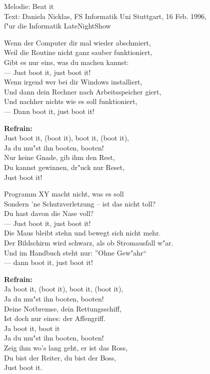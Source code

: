 

\begin{songinfo}
Melodie: Beat it\\
Text: Daniela Nicklas, FS Informatik Uni Stuttgart, 16 Feb. 1996,\\
f"ur die Informatik LateNightShow
\end{songinfo}

\begin{song}

Wenn der Computer dir mal wieder abschmiert,\\
Weil die Routine nicht ganz sauber funktioniert,\\
Gibt es nur eins, was du machen kannst:\\
--- Just boot it, just boot it!\\
Wenn irgend wer bei dir Windows installiert,\\
Und dann dein Rechner nach Arbeitsspeicher giert,\\
Und nachher nichts wie es soll funktioniert,\\
--- Dann boot it, just boot it!

\textbf{Refrain:}\\
Just boot it, (boot it), boot it, (boot it),\\
Ja du mu"st ihn booten, booten!\\
Nur keine Gnade, gib ihm den Rest,\\
Du kannst gewinnen, dr"uck nur Reset,\\
Just boot it!

Programm XY macht nicht, was es soll\\
Sondern 'ne Schutzverletzung -- ist das nicht toll?\\
Du hast davon die Nase voll?\\
--- Just boot it, just boot it!\\
Die Maus bleibt stehn und bewegt sich nicht mehr.\\
Der Bildschirm wird schwarz, als ob Stromausfall w"ar.\\
Und im Handbuch steht nur: ''Ohne Gew"ahr{``}\\
--- dann boot it, just boot it!

\textbf{Refrain:}\\
Ja boot it, (boot it), boot it, (boot it),\\
Ja du mu"st ihn booten, booten!\\
Deine Notbremse, dein Rettungsschiff,\\
Ist doch nur eines: der Affengriff.\\
Ja boot it, boot it\\
Ja du mu"st ihn booten, booten!\\
Zeig ihm wo's lang geht, er ist das Ross,\\
Du bist der Reiter, du bist der Boss,\\
Just boot it.

\end{song}
